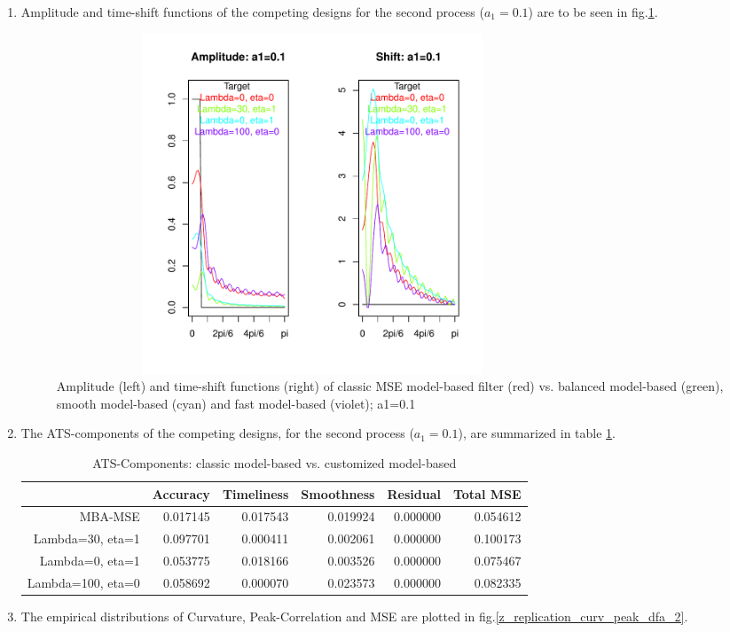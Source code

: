 \documentclass[a4paper]{book}
\begin{document}
\begin{enumerate}
\item Amplitude and time-shift functions of the competing designs for the second process ($a_1=0.1$) are to be seen in fig.\ref{z_replication_amp_shift_dfa_2}. 
\begin{figure}[H]\begin{center}\includegraphics[height=4in, width=6in]{z_replication_amp_shift_dfa_2}\caption{Amplitude (left) and time-shift functions (right) of classic MSE model-based filter (red) vs. balanced model-based (green), smooth model-based (cyan) and fast model-based (violet);  a1=0.1\label{z_replication_amp_shift_dfa_2}}\end{center}\end{figure}\item The ATS-components of the competing designs, for the second process ($a_1=0.1$), are summarized in table \ref{z_replication_ats_dfa_2}.
\begin{table}[ht]
\centering
\begin{tabular}{rrrrrr}
  \hline
 & Accuracy & Timeliness & Smoothness & Residual & Total MSE \\ 
  \hline
MBA-MSE & 0.017145 & 0.017543 & 0.019924 & 0.000000 & 0.054612 \\ 
  Lambda=30, eta=1 & 0.097701 & 0.000411 & 0.002061 & 0.000000 & 0.100173 \\ 
  Lambda=0, eta=1 & 0.053775 & 0.018166 & 0.003526 & 0.000000 & 0.075467 \\ 
  Lambda=100, eta=0 & 0.058692 & 0.000070 & 0.023573 & 0.000000 & 0.082335 \\ 
   \hline
\end{tabular}
\caption{ATS-Components: classic model-based vs. customized model-based } 
\label{z_replication_ats_dfa_2}
\end{table}
\item The empirical distributions of Curvature, Peak-Correlation and MSE are plotted in fig.\ref{z_replication_curv_peak_dfa_2}.


\end{enumerate}
\end{document}
